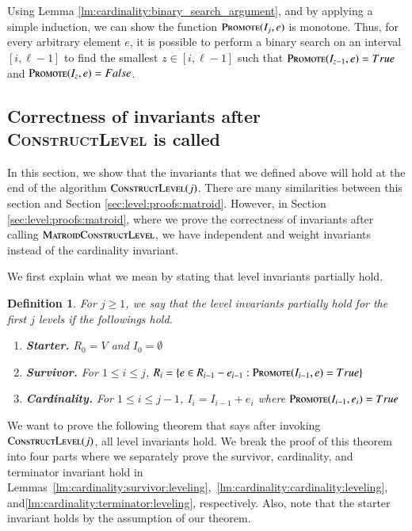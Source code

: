 \documentclass[11pt]{article}
\newtheorem{definition}{Definition}[section]
\newcommand{\constLevel}{\textsc{ConstructLevel}}
\newcommand{\suit}{\textsc{Promote}}
\newcommand{\MatroidConstLevel}{\textsc{MatroidConstructLevel}}
\newcommand{\replacementTester}{\textsc{Promote}}
\begin{document}
Using Lemma \ref{lm:cardinality:binary_search_argument}, and by applying a simple induction, 
we can show the function $\suit(I_j, e)$ 
is monotone.
Thus, for every arbitrary element $e$, 
it is possible to perform a binary search on an interval $[i, \ell-1]$ 
to find the smallest $z\in [i, \ell-1]$ such that $\suit(I_{z-1}, e) = True$ and $\suit(I_z, e) = False$.



\subsection{Correctness of invariants after \constLevel{} is called}
In this section, we show that the invariants that we defined above will hold 
at the end of the algorithm $\constLevel{}(j)$. 
There are many similarities between this section and Section \ref{sec:level:proofs:matroid}.
However, in Section \ref{sec:level:proofs:matroid}, where we prove the correctness of invariants after calling $\MatroidConstLevel{}$, we have independent and weight invariants instead of the cardinality invariant.

We first explain what we mean by stating that level invariants partially hold. 


\begin{tcolorbox}[width=\linewidth, colback=white!80!gray,boxrule=0pt,frame hidden, sharp corners]
\begin{definition}
    For $j \ge 1$, we say that 
    \emph{the level invariants partially hold for the first $j$ levels} if the followings hold.
    \begin{enumerate}
        \item \textbf{Starter.} $R_0 = V$ and $I_0 = \emptyset$
        \item \textbf{Survivor.}  For $1 \leq i \le j$, $R_i = \{ e \in R_{i-1} - e_{i-1}: \replacementTester{}(I_{i-1}, e) = True\}$ 
        \item  \textbf{Cardinality.} For $1 \leq i \le j-1$, $I_i = I_{i-1} + e_i$ where $\suit{}(I_{i-1}, e_i)=True$
    \end{enumerate}
\end{definition}


\end{tcolorbox}




We want to prove the following theorem that says after invoking $\constLevel{}(j)$, 
all level invariants hold. 
We break the proof of this theorem into four parts where 
we separately prove the survivor, cardinality, and terminator invariant hold in Lemmas~\ref{lm:cardinality:survivor:leveling},~\ref{lm:cardinality:cardinality:leveling}, and\ref{lm:cardinality:terminator:leveling}, respectively. 
Also, note that the starter invariant holds by the assumption of our theorem.
\end{document}
